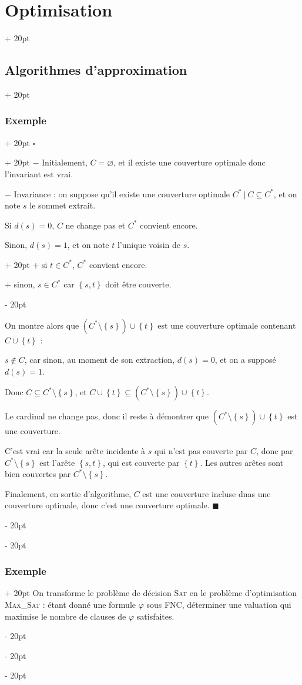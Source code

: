 \documentclass[a4paper, 12pt, twoside]{article}
\newcommand{\lr}[1]{\left( #1 \right)}
\newcommand{\set}[1]{\left\{ #1 \right\}}
\newcommand{\ind}[1][20pt]{\advance\leftskip + #1}
\newcommand{\deind}[1][20pt]{\advance\leftskip - #1}
\newenvironment{indt}[2][20pt]{#2 \par \ind[#1]}{\par \deind} %
\newenvironment{proof}[1][{}]{\begin{indt}{$\square$ #1}}{$\blacksquare$ \end{indt}}
\newcommand{\1}{\mathbbm 1}
\begin{document}
\begin{indt}{\section{Optimisation}}
\begin{indt}{\subsection{Algorithmes d'approximation}}
\begin{indt}{\subsubsection{Exemple}}
\begin{proof}
                    $-$ Initialement, $C = \varnothing$, et il existe une couverture optimale donc l'invariant est vrai.

                    $-$ Invariance : on suppose qu'il existe une couverture optimale $C^*\ |\ C \subseteq C^*$, et on note $s$ le sommet extrait.

                    Si $d(s) = 0$, $C$ ne change pas et $C^*$ convient encore.

                    \begin{indt}{Sinon, $d(s) = 1$, et on note $t$ l'unique voisin de $s$.}
                        $+$ si $t \in C^*$, $C^*$ convient encore.

                        $+$ sinon, $s \in C^*$ car $\set{s, t}$ doit être couverte.
                    \end{indt}

                    On montre alors que $\lr{C^* \setminus \set s} \cup \set t$ est une couverture optimale contenant $C \cup \set t$ :

                    $s \notin C$, car sinon, au moment de son extraction, $d(s) = 0$, et on a supposé $d(s) = 1$.

                    Donc $C \subseteq C^* \setminus \set s$, et $C \cup \set t \subseteq \lr{C^* \setminus \set s} \cup \set t$.

                    Le cardinal ne change pas, donc il reste à démontrer que $\lr{C^* \setminus \set s} \cup \set t$ est une couverture.

                    C'est vrai car la seule arête incidente à $s$ qui n'est pas couverte par $C$, donc par $C^* \setminus \set s$ est l'arête $\set{s, t}$, qui est couverte par $\set t$. Les autres arêtes sont bien couvertes par $C^* \setminus \set s$.

                    Finalement, en sortie d'algorithme, $C$ est une couverture incluse dnas une couverture optimale, donc c'est une couverture optimale.
                \end{proof}
            \end{indt}

            \vspace{12pt}
            
            \begin{indt}{\subsubsection{Exemple}}
                On transforme le problème de décision \textsc{Sat} en le problème d'optimisation \textsc{Max\_Sat} : étant donné une formule $\varphi$ sous FNC, déterminer une valuation qui maximise le nombre de clauses de $\varphi$ satisfaites.


\end{indt}
\end{indt}
\end{indt}
\end{document}
